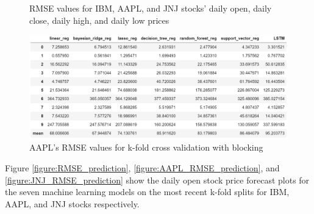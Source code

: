 \documentclass[conference]{IEEEtran}
\begin{document}
\begin{figure}
	\caption{RMSE values for IBM, AAPL, and JNJ stocks' daily open, daily close, daily high, and daily low prices}
	\label{figure:RMSE_forecast_result}
\end{figure}

\begin{figure}
	\includegraphics[width=\linewidth, height=0.12\textheight]{./image/AAPL_special_rmse.PNG}

	\caption{AAPL's RMSE values for k-fold cross validation with blocking}
	\label{figure:AAPL_special_rmse}
\end{figure}

Figure \ref{figure:RMSE_prediction}, \ref{figure:AAPL_RMSE_prediction}, and \ref{figure:JNJ_RMSE_prediction} show the daily open stock price forecast plots for the seven machine learning models on the most recent k-fold splits for IBM, AAPL, and JNJ stocks respectively.
\end{document}
